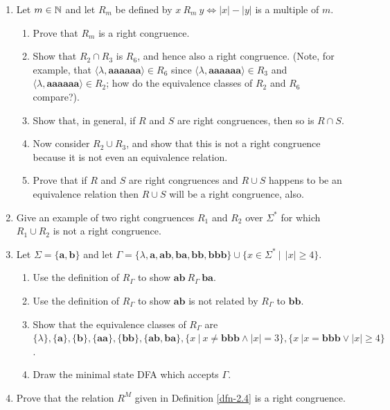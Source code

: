 \begin{enumerate}[{2.}1.]
\item Let $m \in \mathbb{N}$ and let $R_m$ be defined by $x\ R_m\ y \Leftrightarrow
|x|-|y|$ is a multiple of $m$.
\begin{enumerate}
\item Prove that $R_m$ is a right congruence.
\item Show that $R_2 \cap R_3$ is $R_6$, and hence also a right congruence.
(Note, for example, that $\langle\lambda,\pmb{aaaaaa}\rangle \in R_6$ since
$\langle\lambda,\pmb{aaaaaa}\rangle \in R_3$ and $\langle\lambda,\pmb{aaaaaa}
\rangle \in R_2$; how do the equivalence classes of $R_2$ and $R_6$ compare?).
\item Show that, in general, if $R$ and $S$ are right congruences, then so is
$R \cap S$.
\item Now consider $R_2 \cup R_3$, and show that this is not a right congruence
because it is not even an equivalence relation.
\item Prove that if $R$ and $S$ are right congruences and $R \cup S$ happens to
be an equivalence relation then $R \cup S$ will be a right congruence, also.
\end{enumerate}

\item Give an example of two right congruences $R_1$ and $R_2$ over $\Sigma^*$
for which $R_1 \cup R_2$ is not a right congruence.

\item Let $\Sigma=\{\pmb{a},\pmb{b}\}$ and let $\Gamma=\{\lambda,\pmb{a},\pmb{ab},
\pmb{ba},\pmb{bb},\pmb{bbb}\} \cup \{x \in \Sigma^*\ |\ \ |x| \geq 4\}$.
\begin{enumerate}
\item Use the definition of $R_{\Gamma}$ to show $\pmb{ab}\ R_{\Gamma}\
\pmb{ba}$.
\item Use the definition of $R_{\Gamma}$ to show $\pmb{ab}$ is not related by
$R_{\Gamma}$ to $\pmb{bb}$.
\item Show that the equivalence classes of $R_{\Gamma}$ are $\{\lambda\},
\{\pmb{a}\},\{\pmb{b}\},\{\pmb{aa}\},\{\pmb{bb}\},\{\pmb{ab},\pmb{ba}\},
\{x\ |\ x \not= \pmb{bbb} \wedge |x| = 3\},\{x\ |x = \pmb{bbb} \vee |x| \geq 4\}$.
\item Draw the minimal state DFA which accepts $\Gamma$.
\end{enumerate}

\item Prove that the relation $R^M$ given in Definition \ref{dfn-2.4} is a right
congruence.


\end{enumerate}

